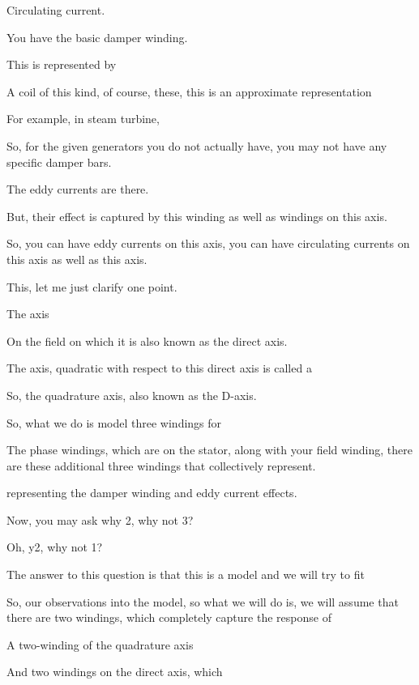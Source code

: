 \documentclass{article}
\begin{document}
Circulating current.

You have the basic damper winding.

This is represented by

A coil of this kind, of course, these, this is an approximate representation

For example, in steam turbine,

So, for the given generators you do not actually have, you may not have any specific damper bars.

The eddy currents are there.

But, their effect is captured by this winding as well as windings on this axis.

So, you can have eddy currents on this axis, you can have circulating currents on this axis as well as this axis.

This, let me just clarify one point.

The axis

On the field on which it is also known as the direct axis.

The axis, quadratic with respect to this direct axis is called a

So, the quadrature axis, also known as the D-axis.

So, what we do is model three windings for

The phase windings, which are on the stator, along with your field winding, there are these additional three windings that collectively represent.

representing the damper winding and eddy current effects.

Now, you may ask why 2, why not 3?

Oh, y2, why not 1?

The answer to this question is that this is a model and we will try to fit

So, our observations into the model, so what we will do is, we will assume that there are two windings, which completely capture the response of

A two-winding of the quadrature axis

And two windings on the direct axis, which
\end{document}
